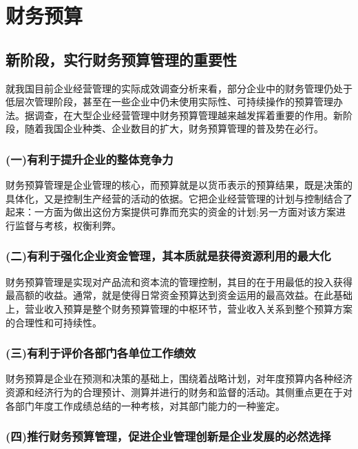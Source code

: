 \section {财务预算}

\subsection {新阶段，实行财务预算管理的重要性}

    就我国目前企业经营管理的实际成效调查分析来看，部分企业中的财务管理仍处于低层次管理阶段，甚至在一些企业中仍未使用实际性、可持续操作的预算管理办法。据调查，在大型企业经营管理中财务预算管理越来越发挥着重要的作用。新阶段，随着我国企业种类、企业数目的扩大，财务预算管理的普及势在必行。

  \subsubsection { (一)有利于提升企业的整体竞争力}

    财务预算管理是企业管理的核心，而预算就是以货币表示的预算结果，既是决策的具体化，又是控制生产经营的活动的依据。它把企业经营管理的计划与控制结合了起来：一方面为做出这份方案提供可靠而充实的资金的计划;另一方面对该方案进行监督与考核，权衡利弊。

   \subsubsection {(二)有利于强化企业资金管理，其本质就是获得资源利用的最大化}

    财务预算管理是实现对产品流和资本流的管理控制，其目的在于用最低的投入获得最高额的收益。通常，就是使得日常资金预算达到资金运用的最高效益。在此基础上，营业收入预算是整个财务预算管理的中枢环节，营业收入关系到整个预算方案的合理性和可持续性。

    \subsubsection {(三)有利于评价各部门各单位工作绩效}

    财务预算是企业在预测和决策的基础上，围绕着战略计划，对年度预算内各种经济资源和经济行为的合理预计、测算并进行的财务和监督的活动。其侧重点更在于对各部门年度工作成绩总结的一种考核，对其部门能力的一种鉴定。

    \subsubsection {(四)推行财务预算管理，促进企业管理创新是企业发展的必然选择}

